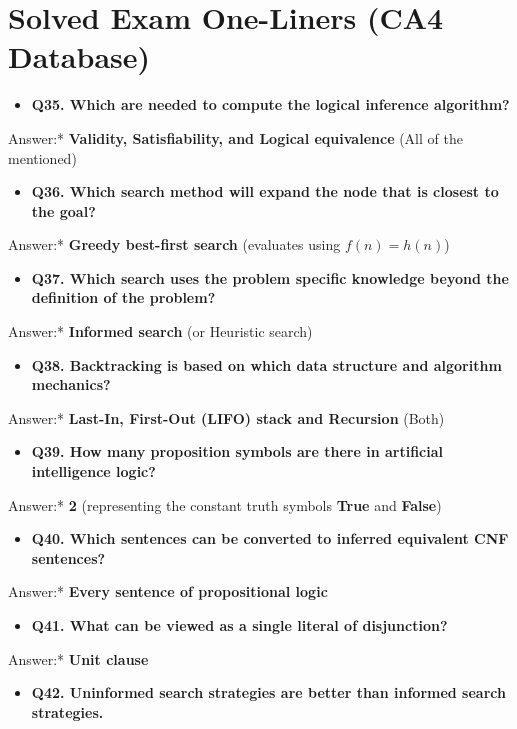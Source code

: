 \section{Solved Exam One-Liners (CA4 Database)}

\begin{itemize}
  \item   \textbf{Q35. Which are needed to compute the logical inference algorithm?}
\end{itemize}
    \textit{   }Answer:* \textbf{Validity, Satisfiability, and Logical equivalence} (All of the mentioned)
\begin{itemize}
  \item   \textbf{Q36. Which search method will expand the node that is closest to the goal?}
\end{itemize}
    \textit{   }Answer:* \textbf{Greedy best-first search} (evaluates using $f(n) = h(n)$)
\begin{itemize}
  \item   \textbf{Q37. Which search uses the problem specific knowledge beyond the definition of the problem?}
\end{itemize}
    \textit{   }Answer:* \textbf{Informed search} (or Heuristic search)
\begin{itemize}
  \item   \textbf{Q38. Backtracking is based on which data structure and algorithm mechanics?}
\end{itemize}
    \textit{   }Answer:* \textbf{Last-In, First-Out (LIFO) stack and Recursion} (Both)
\begin{itemize}
  \item   \textbf{Q39. How many proposition symbols are there in artificial intelligence logic?}
\end{itemize}
    \textit{   }Answer:* \textbf{2} (representing the constant truth symbols \textbf{True} and \textbf{False})
\begin{itemize}
  \item   \textbf{Q40. Which sentences can be converted to inferred equivalent CNF sentences?}
\end{itemize}
    \textit{   }Answer:* \textbf{Every sentence of propositional logic}
\begin{itemize}
  \item   \textbf{Q41. What can be viewed as a single literal of disjunction?}
\end{itemize}
    \textit{   }Answer:* \textbf{Unit clause}
\begin{itemize}
  \item   \textbf{Q42. Uninformed search strategies are better than informed search strategies.}
\end{itemize}

